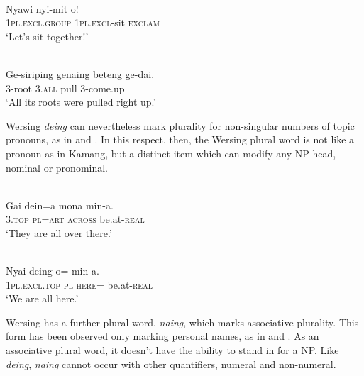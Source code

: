 \ea%
\label{ex:9:59}
 \\
\gll  Nyawi nyi-mit o! \\
   \textsc{1pl.excl.}\textsc{group} \textsc{1pl.excl}-sit \textsc{exclam}  \\
\glt `Let's sit together!'
\z







\ea%
\label{ex:9:60}
 \\
\gll  Ge-siriping genaing beteng ge-dai. \\
 \textsc{3-}root \textsc{3.all}   pull 3-come.up    \\
\glt `All its roots were pulled right up.'
\z





Wersing \textit{d}\textit{eing} can nevertheless mark plurality for non-singular numbers of topic pronouns, as in  and . In this respect, then, the Wersing plural word is not like a pronoun as in Kamang, but a distinct item which can modify any NP head, nominal or pronominal.


\ea%
\label{ex:9:61}
 \\
\gll  Gai dein=a mona min-a. \\
   \textsc{3.top} \textsc{pl}=\textsc{art} \textsc{across} be.at-\textsc{real}  \\
\glt `They are all over there.'
\z







\ea%
\label{ex:9:62}
 \\
\gll  Nyai deing o= min-a. \\
  \textsc{1pl.excl.top} \textsc{pl}   \textsc{here=} be.at-\textsc{real}   \\
\glt `We are all here.'
\z






Wersing has a further plural word, \textit{naing}, which marks associative plurality. This form has been observed only marking personal names, as in  and . As an associative plural word, it doesn't have the ability to stand in for a NP. Like \textit{deing}, \textit{naing} cannot occur with other quantifiers, numeral and non-numeral.


